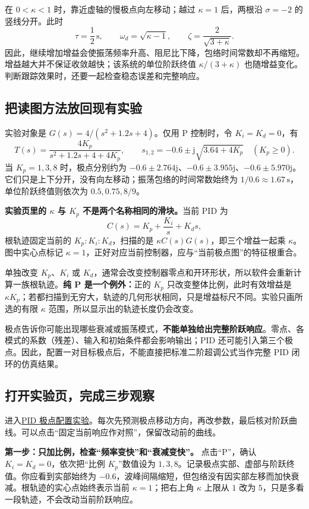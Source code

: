 \documentclass[UTF8,a4paper,11pt,fontset=windows]{ctexart}
\newcommand{\unit}[1]{\,\mathrm{#1}}
\begin{document}
在 $0<\kappa<1$ 时，靠近虚轴的慢极点向左移动；越过 $\kappa=1$ 后，两根沿 $\sigma=-2$ 的竖线分开。此时
\[
  \tau=\frac12\unit{s},\qquad
  \omega_d=\sqrt{\kappa-1},\qquad
  \zeta=\frac{2}{\sqrt{3+\kappa}}.
\]
因此，继续增加增益会使振荡频率升高、阻尼比下降，包络时间常数却不再缩短。增益越大并不保证收敛越快；该系统的单位阶跃终值 $\kappa/(3+\kappa)$ 也随增益变化。判断跟踪效果时，还要一起检查稳态误差和完整响应。

\newpage
\subsection{把读图方法放回现有实验}
实验对象是 $G(s)=4/(s^2+1.2s+4)$。仅用 P 控制时，令 $K_i=K_d=0$，有
\[
  T(s)=\frac{4K_p}{s^2+1.2s+4+4K_p},
  \qquad s_{1,2}=-0.6\pm\mathrm{j}\sqrt{3.64+4K_p}
  \quad(K_p\ge0).
\]
当 $K_p=1,3,8$ 时，极点分别约为 $-0.6\pm2.764\mathrm{j}$、$-0.6\pm3.955\mathrm{j}$、$-0.6\pm5.970\mathrm{j}$。它们只是上下分开，没有向左移动；振荡包络的时间常数始终为 $1/0.6\approx1.67\unit{s}$，单位阶跃终值则依次为 $0.5,0.75,8/9$。

\textbf{实验页里的 $\kappa$ 与 $K_p$ 不是两个名称相同的滑块。}当前 PID 为
\[
  C(s)=K_p+\frac{K_i}{s}+K_ds,
\]
根轨迹固定当前的 $K_p:K_i:K_d$，扫描的是 $\kappa C(s)G(s)$，即三个增益一起乘 $\kappa$。图中实心点标记 $\kappa=1$，正好对应当前控制器，应与“当前极点图”的特征根重合。

单独改变 $K_p$、$K_i$ 或 $K_d$，通常会改变控制器零点和开环形状，所以软件会重新计算一族根轨迹。\textbf{纯 P 是一个例外：}正的 $K_p$ 只改变整体比例，此时有效增益是 $\kappa K_p$；若都扫描到无穷大，轨迹的几何形状相同，只是增益标尺不同。实验只画所选的有限 $\kappa$ 范围，所以显示出的轨迹长度仍会改变。

\begin{keybox}
极点告诉你可能出现哪些衰减或振荡模式，\textbf{不能单独给出完整阶跃响应}。零点、各模式的系数（残差）、输入和初始条件都会影响输出；PID 还可能引入第三个极点。因此，配置一对目标极点后，不能直接把标准二阶超调公式当作完整 PID 闭环的仿真结果。
\end{keybox}

\newpage
\subsection{打开实验页，完成三步观察}
进入\href{https://youngx-ray.github.io/labs/second-order-pid/}{PID 极点配置实验}。每次先预测极点移动方向，再改参数，最后核对阶跃曲线。可以点击“固定当前响应作对照”，保留改动前的曲线。

\textbf{第一步：只加比例，检查“频率变快”和“衰减变快”。}
点击“P”，确认 $K_i=K_d=0$，依次把“比例 $K_p$”数值设为 $1,3,8$。记录极点实部、虚部与阶跃终值。你应看到实部始终为 $-0.6$，波峰间隔缩短，但包络没有因实部左移而加快衰减。根轨迹的实心点始终表示当前 $\kappa=1$；把右上角 $\kappa$ 上限从 $1$ 改为 $5$，只是多看一段轨迹，不会改动当前阶跃响应。
\end{document}
